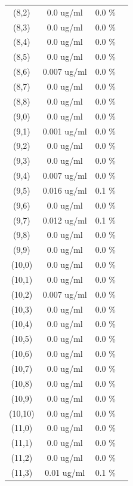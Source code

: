 \documentclass{article}
\begin{document}
\begin{tabular}{c c c c}
(8,2)&        0.0 ug/ml        &0.0 \%\\
(8,3)&        0.0 ug/ml        &0.0 \%\\
(8,4)&        0.0 ug/ml        &0.0 \%\\
(8,5)&        0.0 ug/ml        &0.0 \%\\
(8,6)&        0.007 ug/ml        &0.0 \%\\
(8,7)&        0.0 ug/ml        &0.0 \%\\
(8,8)&        0.0 ug/ml        &0.0 \%\\
(9,0)&        0.0 ug/ml        &0.0 \%\\
(9,1)&        0.001 ug/ml        &0.0 \%\\
(9,2)&        0.0 ug/ml        &0.0 \%\\
(9,3)&        0.0 ug/ml        &0.0 \%\\
(9,4)&        0.007 ug/ml        &0.0 \%\\
(9,5)&        0.016 ug/ml        &0.1 \%\\
(9,6)&        0.0 ug/ml        &0.0 \%\\
(9,7)&        0.012 ug/ml        &0.1 \%\\
(9,8)&        0.0 ug/ml        &0.0 \%\\
(9,9)&        0.0 ug/ml        &0.0 \%\\
(10,0)&        0.0 ug/ml        &0.0 \%\\
(10,1)&        0.0 ug/ml        &0.0 \%\\
(10,2)&        0.007 ug/ml        &0.0 \%\\
(10,3)&        0.0 ug/ml        &0.0 \%\\
(10,4)&        0.0 ug/ml        &0.0 \%\\
(10,5)&        0.0 ug/ml        &0.0 \%\\
(10,6)&        0.0 ug/ml        &0.0 \%\\
(10,7)&        0.0 ug/ml        &0.0 \%\\
(10,8)&        0.0 ug/ml        &0.0 \%\\
(10,9)&        0.0 ug/ml        &0.0 \%\\
(10,10)&        0.0 ug/ml        &0.0 \%\\
(11,0)&        0.0 ug/ml        &0.0 \%\\
(11,1)&        0.0 ug/ml        &0.0 \%\\
(11,2)&        0.0 ug/ml        &0.0 \%\\
(11,3)&        0.01 ug/ml        &0.1 \%\\

\end{tabular}
\end{document}
